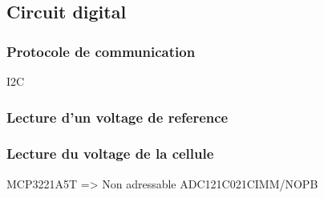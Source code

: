 \documentclass[12pt,letterpaper]{article}
\begin{document}
\begin{normalsize}
			\subsection{Circuit digital}
				\subsubsection{Protocole de communication}
					I2C\\
				\subsubsection{Lecture d'un voltage de reference}
				\subsubsection{Lecture du voltage de la cellule}
					MCP3221A5T => Non adressable
					ADC121C021CIMM/NOPB
				
	\end{normalsize}
\end{document}

